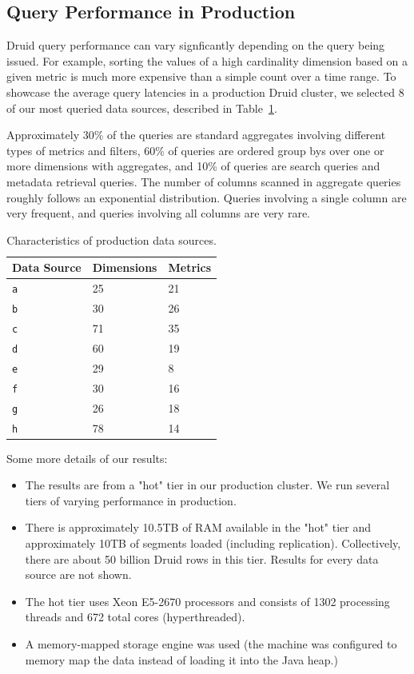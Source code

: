 \documentclass{acm_proc_article-sp}
\begin{document}
\subsection{Query Performance in Production}
Druid query performance can vary signficantly depending on the query
being issued. For example, sorting the values of a high cardinality dimension
based on a given metric is much more expensive than a simple count over a time
range. To showcase the average query latencies in a production Druid cluster,
we selected 8 of our most queried data sources, described in
Table~\ref{tab:datasources}.

Approximately 30\% of the queries are standard
aggregates involving different types of metrics and filters, 60\% of queries
are ordered group bys over one or more dimensions with aggregates, and 10\% of
queries are search queries and metadata retrieval queries. The number of
columns scanned in aggregate queries roughly follows an exponential
distribution. Queries involving a single column are very frequent, and queries
involving all columns are very rare.

\begin{table}
  \centering
  \label{tab:datasources}
  \begin{tabular}{| l | l | l |}
    \hline
    \textbf{Data Source} & \textbf{Dimensions} & \textbf{Metrics} \\ \hline
    \texttt{a} & 25 & 21 \\ \hline
    \texttt{b} & 30 & 26 \\ \hline
    \texttt{c} & 71 & 35 \\ \hline
    \texttt{d} & 60 & 19 \\ \hline
    \texttt{e} & 29 & 8 \\ \hline
    \texttt{f} & 30 & 16 \\ \hline
    \texttt{g} & 26 & 18 \\ \hline
    \texttt{h} & 78 & 14 \\ \hline
  \end{tabular}
  \caption{Characteristics of production data sources.}
\end{table}

Some more details of our results:

\begin{itemize}
\item The results are from a "hot" tier in our production cluster. We run
several tiers of varying performance in production.

\item There is approximately 10.5TB of RAM available in the "hot" tier and
approximately 10TB of segments loaded (including replication). Collectively,
there are about 50 billion Druid rows in this tier. Results for
every data source are not shown.

\item The hot tier uses Xeon E5-2670 processors and consists of 1302 processing
threads and 672 total cores (hyperthreaded).

\item A memory-mapped storage engine was used (the machine was configured to
    memory map the data instead of loading it into the Java heap.)
\end{itemize}
\end{document}

